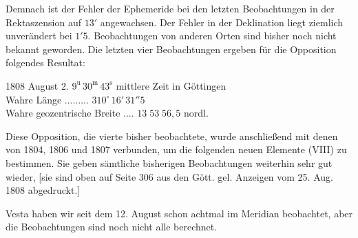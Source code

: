 \par\indent Demnach ist der Fehler der Ephemeride bei den letzten Beobachtungen in der Rektaszension auf $13'$ angewachsen. Der Fehler in der Deklination liegt ziemlich unverändert bei $1'5$. Beobachtungen von anderen Orten sind bisher noch nicht bekannt geworden. Die letzten vier Beobachtungen ergeben für die Opposition folgendes Resultat:

\begin{center}
1808 August 2. $9^{\text{u}}\,30^{\text{m}}\,43^{\text{s}}$ mittlere Zeit in Göttingen\\
Wahre Länge .\;.\;.\;.\;.\;.\;.\;.\;.\; $310^\circ\,16'\,31''5$\\
Wahre geozentrische Breite .\;.\;.\;.\; $13\;53\;56,5$ nordl. \end{center}

\par\indent Diese Opposition, die vierte bisher beobachtete, wurde anschließend mit denen von 1804, 1806 und 1807 verbunden, um die folgenden neuen Elemente (VIII) zu bestimmen. Sie geben sämtliche bisherigen Beobachtungen weiterhin sehr gut wieder, [sie sind oben auf Seite 306 aus den Gött. gel. Anzeigen vom 25. Aug. 1808 abgedruckt.]

\par\indent Vesta haben wir seit dem 12. August schon achtmal im Meridian beobachtet, aber die Beobachtungen sind noch nicht alle berechnet.

\par{}
